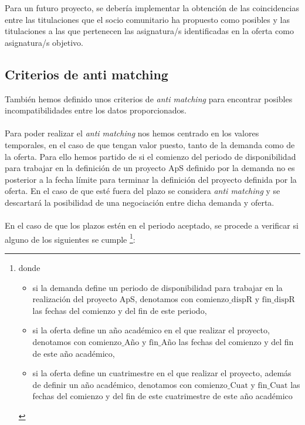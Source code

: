 \documentclass[11pt]{book}
\begin{document}
	Para un futuro proyecto, se debería implementar la obtención de las coincidencias entre las
	titulaciones que el socio comunitario ha propuesto como posibles y las
	titulaciones a las que pertenecen las asignatura/s identificadas en la
	oferta como asignatura/s objetivo. 

\subsection{Criterios de anti matching }

También hemos definido unos criterios de \emph{anti matching} para encontrar posibles incompatibilidades entre los datos proporcionados.\\\\
Para poder realizar el \emph{anti matching} nos hemos centrado en los valores temporales, en el caso de que tengan valor puesto, tanto de la demanda como de la oferta. Para ello hemos partido de si el comienzo del periodo de disponibilidad para trabajar en la definición
de un proyecto ApS definido por la demanda no es posterior a la fecha límite para terminar la
definición del proyecto definida por la oferta. En el caso de que esté fuera del plazo se considera \emph{anti matching} y se descartará la posibilidad de una negociación entre dicha demanda y oferta. \\\\

En el caso de que los plazos estén en el periodo aceptado, se procede a
verificar si alguno de los siguientes se cumple 
\footnote{donde
	\begin{itemize}
		\item si la demanda define un periodo de disponibilidad para trabajar
		en la realización del proyecto ApS, denotamos con
		$\mbox{comienzo}\_\mbox{dispR}$ y $\mbox{fin}\_\mbox{dispR}$ las fechas
		del comienzo y del fin de este periodo,
		\item si la oferta define un año académico en el que realizar el
		proyecto, denotamos con $\mbox{comienzo}\_\mbox{Año}$ y
		$\mbox{fin}\_\mbox{Año}$ las fechas del comienzo y del fin de este año
		académico,
		\item si la oferta define un cuatrimestre en el que realizar el
		proyecto, además de definir un año académico, denotamos con
	 	$\mbox{comienzo}\_\mbox{Cuat}$ y $\mbox{fin}\_\mbox{Cuat}$ las fechas del
		comienzo y del fin de este cuatrimestre de este año académico
	\end{itemize} }:
\end{document}
